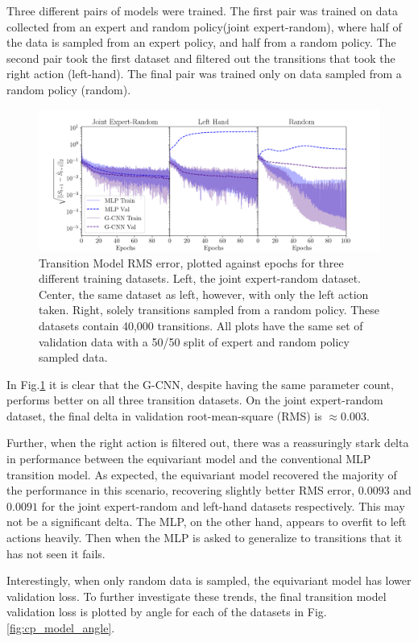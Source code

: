 Three different pairs of models were trained. The first pair was trained on data collected from an expert and random policy(joint expert-random), where half of the data is sampled from an expert policy, and half from a random policy. The second pair took the first dataset and filtered out the transitions that took the right action (left-hand). The final pair was trained only on data sampled from a random policy (random).
\begin{figure}
	\centering
	\includegraphics[width=\linewidth]{Figures/transition_model_loss.png}
	\caption{Transition Model RMS error, plotted against epochs for three different training datasets. Left, the joint expert-random dataset. Center, the same dataset as left, however, with only the left action taken. Right, solely transitions sampled from a random policy. These datasets contain 40,000 transitions. All plots have the same set of validation data with a 50/50 split of expert and random policy sampled data.}
	\label{fig:cp_tm}
\end{figure}

In Fig.\ref{fig:cp_tm} it is clear that the G-CNN, despite having the same parameter count, performs better on all three transition datasets. On the joint expert-random dataset, the final delta in validation root-mean-square (RMS) is $\approx 0.003$.

Further, when the right action is filtered out, there was a reassuringly stark delta in performance between the equivariant model and the conventional MLP transition model. As expected, the equivariant model recovered the majority of the performance in this scenario, recovering slightly better RMS error, $0.0093$ and $0.0091$ for the joint expert-random and left-hand datasets respectively. This may not be a significant delta. The MLP, on the other hand, appears to overfit to left actions heavily. Then when the MLP is asked to generalize to transitions that it has not seen it fails.

Interestingly, when only random data is sampled, the equivariant model has lower validation loss. To further investigate these trends, the final transition model validation loss is plotted by angle for each of the datasets in Fig.\ref{fig:cp_model_angle}.


